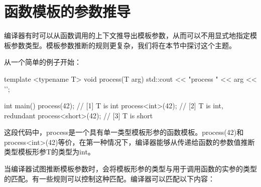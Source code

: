 \section{函数模板的参数推导}
编译器有时可以从函数调用的上下文推导出模板参数，从而可以不用显式地指定模板参数类型。模板参数推断的规则更复杂，我们将在本节中探讨这个主题。

从一个简单的例子开始：

\begin{cpp}
template <typename T>
void process(T arg)
{
	std::cout << "process " << arg << '\n';
}

int main()
{
	process(42); // [1] T is int
	process<int>(42); // [2] T is int, redundant
	process<short>(42); // [3] T is short
}
\end{cpp}

这段代码中，process是一个具有单一类型模板形参的函数模板。process(42)和process<int>(42)等价，在第一种情况下，编译器能够从传递给函数的参数值推断类型模板形参T的类型为int。

当编译器试图推断模板参数时，会将模板形参的类型与用于调用函数的实参的类型的匹配。有一些规则可以控制这种匹配。编译器可以匹配以下内容：

